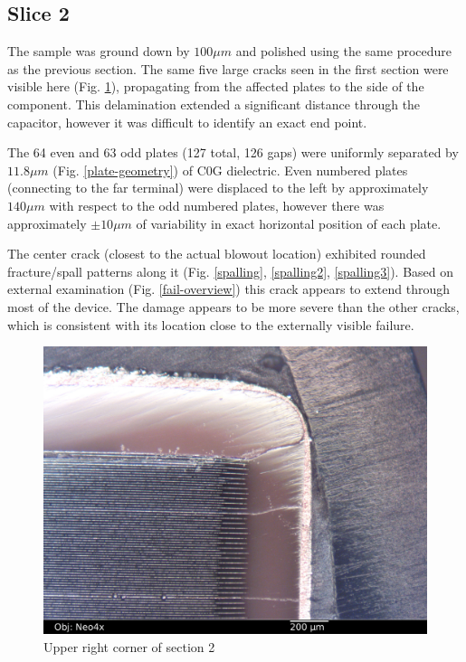 \documentclass{article}
\begin{document}
\subsection{Slice 2}

The sample was ground down by $100 \mu m$ and polished using the same procedure as the previous section. The same five
large cracks seen in the first section were visible here (Fig. \ref{section2_1}), propagating from the affected plates
to the side of the component. This delamination extended a significant distance through the capacitor, however it was
difficult to identify an exact end point.

The 64 even and 63 odd plates (127 total, 126 gaps) were uniformly separated by $11.8 \mu m$ (Fig.
\ref{plate-geometry}) of C0G dielectric. Even numbered plates (connecting to the far terminal) were displaced to the
left by approximately $140 \mu m$ with respect to the odd numbered plates, however there was approximately
$\pm 10 \mu m$ of variability in exact horizontal position of each plate.

The center crack (closest to the actual blowout location) exhibited rounded fracture/spall patterns along it (Fig.
\ref{spalling}, \ref{spalling2}, \ref{spalling3}). Based on external examination (Fig. \ref{fail-overview}) this crack
appears to extend through most of the device. The damage appears to be more severe than the other cracks, which is
consistent with its location close to the externally visible failure.

\begin{figure}[h]
\includegraphics[width=14cm,keepaspectratio]{section2_02_df_neo4x_annotated.jpg}
\caption{Upper right corner of section 2}
\label{section2_1}
\end{figure}
\end{document}

